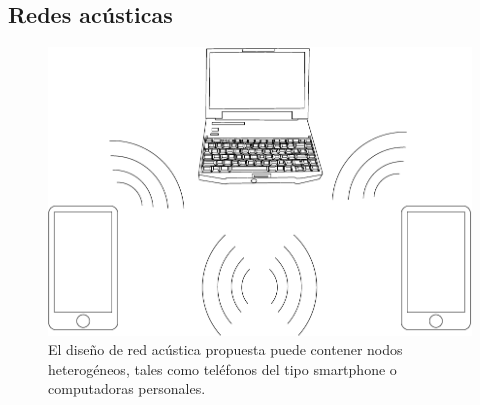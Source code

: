 
\subsection{Redes acústicas}
\begin{figure}[!t]
  \centering
    \includegraphics[width=4.5in]{graphs/compucelus.pdf}
    \caption{El diseño de red acústica propuesta puede contener nodos heterogéneos, tales como teléfonos del tipo smartphone o computadoras personales.}
    \label{arch:chain}
\end{figure}

